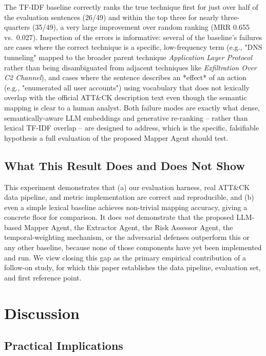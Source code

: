 \documentclass[runningheads]{llncs}
\begin{document}
The TF-IDF baseline correctly ranks the true technique first for just over half of the evaluation sentences (26/49) and within the top three for nearly three-quarters (35/49), a very large improvement over random ranking (MRR 0.655 vs.\ 0.027). Inspection of the errors is informative: several of the baseline's failures are cases where the correct technique is a specific, low-frequency term (e.g., "DNS tunneling" mapped to the broader parent technique \emph{Application Layer Protocol} rather than being disambiguated from adjacent techniques like \emph{Exfiltration Over C2 Channel}), and cases where the sentence describes an *effect* of an action (e.g., "enumerated all user accounts") using vocabulary that does not lexically overlap with the official ATT\&CK description text even though the semantic mapping is clear to a human analyst. Both failure modes are exactly what dense, semantically-aware LLM embeddings and generative re-ranking -- rather than lexical TF-IDF overlap -- are designed to address, which is the specific, falsifiable hypothesis a full evaluation of the proposed Mapper Agent should test.

\subsection{What This Result Does and Does Not Show}

This experiment demonstrates that (a) our evaluation harness, real ATT\&CK data pipeline, and metric implementation are correct and reproducible, and (b) even a simple lexical baseline achieves non-trivial mapping accuracy, giving a concrete floor for comparison. It does \emph{not} demonstrate that the proposed LLM-based Mapper Agent, the Extractor Agent, the Risk Assessor Agent, the temporal-weighting mechanism, or the adversarial defenses outperform this or any other baseline, because none of those components have yet been implemented and run. We view closing this gap as the primary empirical contribution of a follow-on study, for which this paper establishes the data pipeline, evaluation set, and first reference point.

\section{Discussion}
\label{sec:discussion}

\subsection{Practical Implications}
\end{document}
